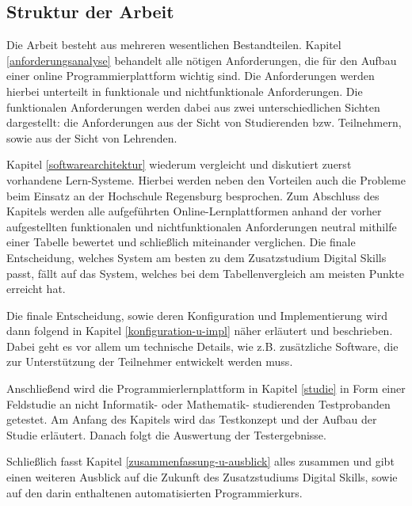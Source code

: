 \subsection{Struktur der Arbeit}\label{struktur-der-arbeit}
Die Arbeit besteht aus mehreren wesentlichen Bestandteilen. Kapitel
\ref{anforderungsanalyse} behandelt alle nötigen Anforderungen, die für den
Aufbau einer online Programmierplattform wichtig sind. Die Anforderungen werden
hierbei unterteilt in funktionale und nichtfunktionale Anforderungen. Die
funktionalen Anforderungen werden dabei aus zwei unterschiedlichen Sichten
dargestellt: die Anforderungen aus der Sicht von Studierenden bzw. Teilnehmern,
sowie aus der Sicht von Lehrenden.

Kapitel \ref{softwarearchitektur} wiederum vergleicht und diskutiert zuerst
vorhandene Lern-Systeme. Hierbei werden neben den Vorteilen auch die Probleme
beim Einsatz an der Hochschule Regensburg besprochen. Zum Abschluss des Kapitels
werden alle aufgeführten Online-Lernplattformen anhand der vorher aufgestellten
funktionalen und nichtfunktionalen Anforderungen neutral mithilfe einer Tabelle
bewertet und schließlich miteinander verglichen. Die finale Entscheidung,
welches System am besten zu dem Zusatzstudium Digital Skills passt, fällt auf
das System, welches bei dem Tabellenvergleich am meisten Punkte erreicht hat.

Die finale Entscheidung, sowie deren Konfiguration und Implementierung wird
dann folgend in Kapitel \ref{konfiguration-u-impl} näher erläutert und
beschrieben. Dabei geht es vor allem um technische Details, wie z.B. zusätzliche
Software, die zur Unterstützung der Teilnehmer entwickelt werden muss.

Anschließend wird die Programmierlernplattform in Kapitel \ref{studie} in Form
einer Feldstudie an nicht Informatik- oder Mathematik- studierenden
Testprobanden getestet. Am Anfang des Kapitels wird das Testkonzept und der
Aufbau der Studie erläutert. Danach folgt die Auswertung der Testergebnisse.

Schließlich fasst Kapitel \ref{zusammenfassung-u-ausblick} alles zusammen und
gibt einen weiteren Ausblick auf die Zukunft des Zusatzstudiums Digital Skills,
sowie auf den darin enthaltenen automatisierten Programmierkurs.